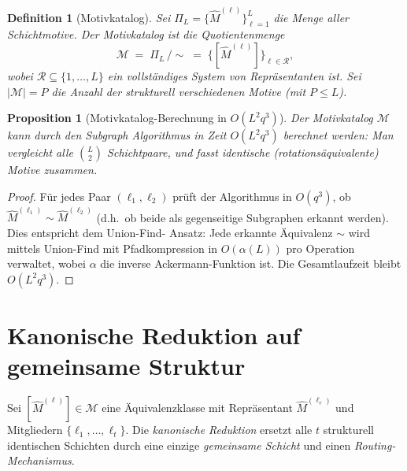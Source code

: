 ﻿\documentclass[12pt, a4paper, openany]{report}
\newtheorem{proposition}[theorem]{Proposition}
\newtheorem{definition}[theorem]{Definition}
\newcommand{\calR}{\mathcal{R}}
\newcommand{\calM}{\mathcal{M}}
\begin{document}
\begin{definition}[Motivkatalog]
\label{def:motif_catalog}
Sei $\Pi_L = \{\hat{M}^{(\ell)}\}_{\ell=1}^L$ die Menge aller Schichtmotive.
Der \emph{Motivkatalog} ist die Quotientenmenge
\[
  \calM \;=\; \Pi_L \,/\!\sim
  \;=\; \bigl\{[\hat{M}^{(\ell)}]\bigr\}_{\ell \in \calR},
\]
wobei $\calR \subseteq \{1,\ldots,L\}$ ein vollständiges System von
Repräsentanten ist.  Sei $|\calM| = P$ die Anzahl der strukturell
verschiedenen Motive (mit $P \leq L$).
\end{definition}

\begin{proposition}[Motivkatalog-Berechnung in $O(L^2 q^3)$]
\label{prop:catalog_complexity}
Der Motivkatalog $\calM$ kann durch den Subgraph Algorithmus in Zeit
$O(L^2 q^3)$ berechnet werden: Man vergleicht alle $\binom{L}{2}$
Schichtpaare, und fasst identische (rotationsäquivalente) Motive zusammen.
\end{proposition}

\begin{proof}
Für jedes Paar $(\ell_1, \ell_2)$ prüft der Algorithmus in $O(q^3)$,
ob $\hat{M}^{(\ell_1)} \sim \hat{M}^{(\ell_2)}$ (d.h.\ ob beide als
gegenseitige Subgraphen erkannt werden).  Dies entspricht dem Union-Find-
Ansatz: Jede erkannte Äquivalenz $\sim$ wird mittels Union-Find mit Pfadkompression
in $O(\alpha(L))$ pro Operation verwaltet, wobei $\alpha$ die inverse
Ackermann-Funktion ist.  Die Gesamtlaufzeit bleibt $O(L^2 q^3)$.
\end{proof}

\section{Kanonische Reduktion auf gemeinsame Struktur}
\label{sec:sgkr_reduction}

Sei $[\hat{M}^{(\ell)}] \in \calM$ eine Äquivalenzklasse mit Repräsentant
$\hat{M}^{(\ell_r)}$ und Mitgliedern $\{\ell_1, \ldots, \ell_t\}$.
Die \emph{kanonische Reduktion} ersetzt alle $t$ strukturell identischen
Schichten durch eine einzige \emph{gemeinsame Schicht} und einen
\emph{Routing-Mechanismus}.
\end{document}
